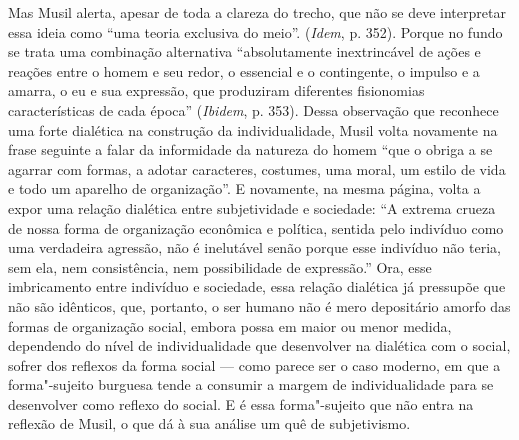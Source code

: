 Mas Musil alerta, apesar de toda a clareza do trecho, que não se deve
interpretar essa ideia como ``uma teoria exclusiva do meio''.
(\emph{Idem}, p. 352). Porque no fundo se trata uma combinação
alternativa ``absolutamente inextrincável de ações e reações entre o
homem e seu redor, o essencial e o contingente, o impulso e a amarra, o
eu e sua expressão, que produziram diferentes fisionomias
características de cada época'' (\emph{Ibidem}, p. 353). Dessa observação
que reconhece uma forte dialética na construção da individualidade,
Musil volta novamente na frase seguinte a falar da informidade da
natureza do homem ``que o obriga a se agarrar com formas, a adotar
caracteres, costumes, uma moral, um estilo de vida e todo um aparelho de
organização''. E novamente, na mesma página, volta a expor uma relação
dialética entre subjetividade e sociedade: ``A extrema crueza de nossa
forma de organização econômica e política, sentida pelo indivíduo como
uma verdadeira agressão, não é inelutável senão porque esse indivíduo
não teria, sem ela, nem consistência, nem possibilidade de expressão.''
Ora, esse imbricamento entre indivíduo e sociedade, essa relação
dialética já pressupõe que não são idênticos, que, portanto, o ser
humano não é mero depositário amorfo das formas de organização social,
embora possa em maior ou menor medida, dependendo do nível de
individualidade que desenvolver na dialética com o social, sofrer dos
reflexos da forma social --- como parece ser o caso moderno, em que a
forma"-sujeito burguesa tende a consumir a margem de individualidade para
se desenvolver como reflexo do social. E é essa forma"-sujeito que não
entra na reflexão de Musil, o que dá à sua análise um quê de
subjetivismo.

